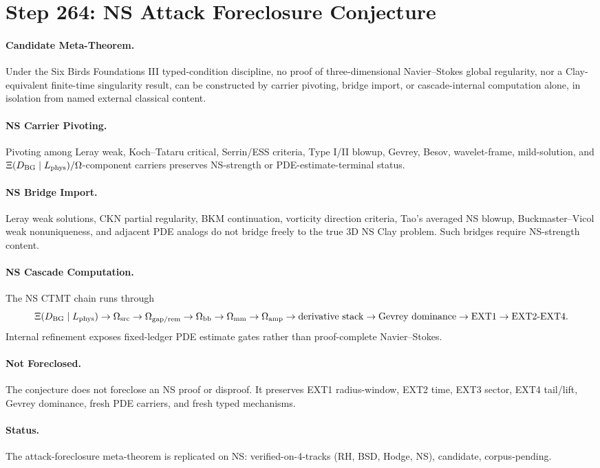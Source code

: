 \section*{Step 264: NS Attack Foreclosure Conjecture}

\paragraph{Candidate Meta-Theorem.}
Under the Six Birds Foundations III typed-condition discipline, no proof of
three-dimensional Navier--Stokes global regularity, nor a Clay-equivalent
finite-time singularity result, can be constructed by carrier pivoting, bridge
import, or cascade-internal computation alone, in isolation from named external
classical content.

\paragraph{NS Carrier Pivoting.}
Pivoting among Leray weak, Koch--Tataru critical, Serrin/ESS criteria, Type I/II
blowup, Gevrey, Besov, wavelet-frame, mild-solution, and
\(\Xi(D_{\rm BG}\mid L_{\rm phys})/\Omega\)-component carriers preserves
NS-strength or PDE-estimate-terminal status.

\paragraph{NS Bridge Import.}
Leray weak solutions, CKN partial regularity, BKM continuation, vorticity
direction criteria, Tao's averaged NS blowup, Buckmaster--Vicol weak
nonuniqueness, and adjacent PDE analogs do not bridge freely to the true 3D NS
Clay problem.  Such bridges require NS-strength content.

\paragraph{NS Cascade Computation.}
The NS CTMT chain runs through
\[
\Xi(D_{\rm BG}\mid L_{\rm phys}) \to \Omega_{\rm src}\to
\Omega_{\rm gap/rem}\to \Omega_{\rm bb}\to \Omega_{\rm mm}\to
\Omega_{\rm amp}\to \text{derivative stack}\to \text{Gevrey dominance}
\to \mathrm{EXT1}\to \mathrm{EXT2\text{-}EXT4}.
\]
Internal refinement exposes fixed-ledger PDE estimate gates rather than
proof-complete Navier--Stokes.

\paragraph{Not Foreclosed.}
The conjecture does not foreclose an NS proof or disproof.  It preserves EXT1
radius-window, EXT2 time, EXT3 sector, EXT4 tail/lift, Gevrey dominance, fresh
PDE carriers, and fresh typed mechanisms.

\paragraph{Status.}
The attack-foreclosure meta-theorem is replicated on NS:
verified-on-4-tracks (RH, BSD, Hodge, NS), candidate, corpus-pending.
